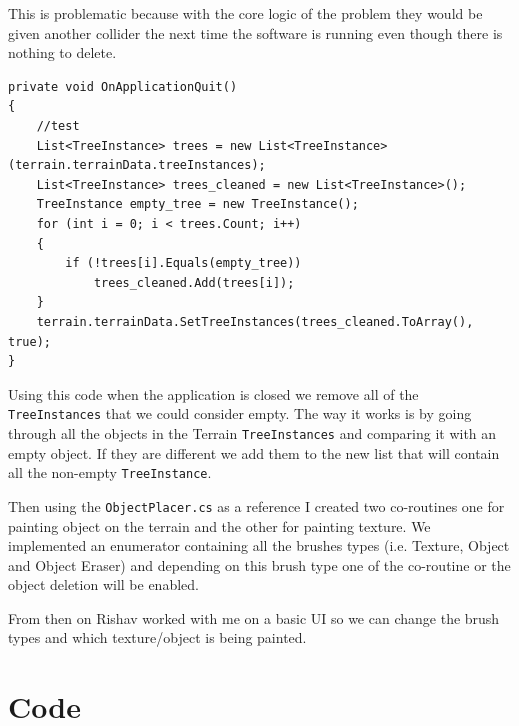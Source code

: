This is problematic because with the core logic of the problem they would be given another collider the next time the software is running even though there is nothing to delete.

\begin{verbatim}
private void OnApplicationQuit()
{
    //test
    List<TreeInstance> trees = new List<TreeInstance>(terrain.terrainData.treeInstances);
    List<TreeInstance> trees_cleaned = new List<TreeInstance>();
    TreeInstance empty_tree = new TreeInstance();
    for (int i = 0; i < trees.Count; i++)
    {
        if (!trees[i].Equals(empty_tree))
            trees_cleaned.Add(trees[i]);
    }
    terrain.terrainData.SetTreeInstances(trees_cleaned.ToArray(), true);
}
\end{verbatim}

Using this code when the application is closed we remove all of the \texttt{TreeInstances} that we could consider empty. The way it works is by going through all the objects in the Terrain \texttt{TreeInstances}  and comparing it with an empty object. If they are different we add them to the new list that will contain all the non-empty \texttt{TreeInstance}.

Then using the \texttt{ObjectPlacer.cs} as a reference I created two co-routines one for painting object on the terrain and the other for painting texture. We implemented an enumerator containing all the brushes types (i.e. Texture, Object and Object Eraser) and depending on this brush type one of the co-routine or the object deletion will be enabled.

From then on Rishav worked with me on a basic UI so we can change the brush types and which texture/object is being painted.

\section{Code} \label{sec:appendix-b}
